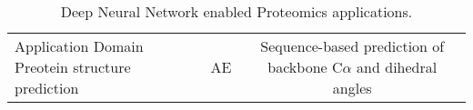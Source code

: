 \begin{table}[h!]
\centering
\begin{tabular}{||l|c|c||}
    \hline
    Application Domain 
    Preotein structure prediction & AE & Sequence-based prediction of backbone C$\alpha$ and dihedral angles 
    \hline
\end{tabular}
\caption{Deep Neural Network enabled Proteomics applications.}
\label{tab:PS-DNN}
\end{table}